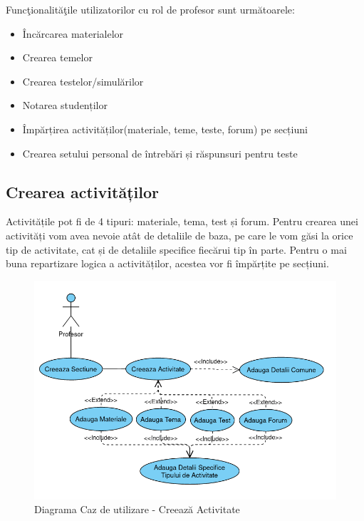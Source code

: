 \documentclass[12pt, a4paper, oneside, romanian]{teza-upb}
\begin{document}
Funcţionalităţile utilizatorilor cu rol de profesor sunt următoarele:
\begin{itemize}
	\item Încărcarea materialelor
	\item Crearea temelor
	\item Crearea testelor/simulărilor
	\item Notarea studenților
	\item Împărțirea activităților(materiale, teme, teste, forum) pe secțiuni
	\item Crearea setului personal de întrebări și răspunsuri pentru teste
\end{itemize}

\subsection{Crearea activităților}

Activitățile pot fi de 4 tipuri: materiale, tema, test și forum. Pentru crearea unei activități vom avea nevoie atât de detaliile de baza, pe care le vom găsi la orice tip de activitate, cat și de detaliile specifice fiecărui tip în parte. Pentru o mai buna repartizare logica a activităților, acestea vor fi împărțite pe secțiuni.

\begin{figure}[H]
\centering
\includegraphics*[width=0.9\columnwidth]{diagrama-use-case-creeaza-activitate}
\caption{Diagrama Caz de utilizare - Creează Activitate}
\label{diagrama-use-case-creeaza-activitate}
\end{figure}
\end{document}
